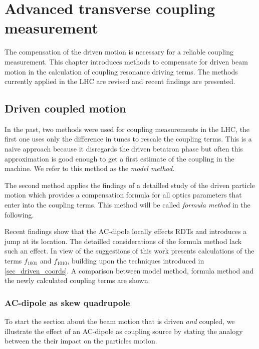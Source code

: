 \chapter{Advanced transverse coupling measurement} 
 \label{sec_coupling}

\begin{chapterinfo}
    The compensation of the driven motion is necessary for a reliable coupling measurement.
    This chapter introduces methods to compensate for driven beam motion in the calculation of
    coupling resonance driving terms. The methods currently applied in the LHC are revised and
    recent findings are presented.
\end{chapterinfo}

\section{Driven coupled motion}
In the past, two methods were used for coupling measurements in
the LHC, the first one uses only the difference in tunes to rescale the coupling terms. This is
a naive approach because it disregards the driven betatron phase but often this approximation is
good enough to get a first estimate of the coupling in the machine. We refer to this method as the
\emph{model method}.

The second method \cite{Miyamoto2010} applies the findings of a detailled study of the driven particle motion
which provides a compensation formula for all optics parameters that enter into the coupling terms. This method will
be called \emph{formula method} in the following.

Recent findings \cite{Carlier2020} show that the AC-dipole locally effects RDTs and introduces
a jump at its location. The detailled considerations of the formula method lack such an effect.
In view of the suggestions of \cite{Carlier2020} this work presents calculations of the terms
$f_{1001}$ and $f_{1010}$, building upon the techniques introduced in \ref{sec_driven_coords}.
A comparison between model method, formula method and the newly calculated coupling terms are shown.


\subsection{AC-dipole as skew quadrupole}

To start the section about the beam motion that is driven \emph{and} coupled,
we illustrate the effect of an AC-dipole as coupling source by stating the analogy between the their
impact on the particles motion.

